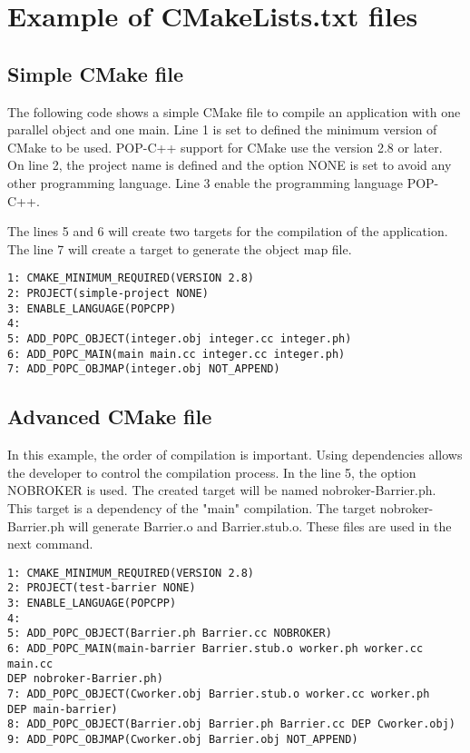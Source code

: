 \documentclass[a4paper, 11pt]{article}
\newcommand{\s}{\vspace{0.3cm}}
\begin{document}
\section{Example of CMakeLists.txt files}
\label{chap:example}
\subsection{Simple CMake file}
The following code shows a simple CMake file to compile an application with one parallel object and one main. Line 1 is set to defined the minimum version of CMake to be used. POP-C++ support for CMake use the version 2.8 or later. \\
On line 2, the project name is defined and the option NONE is set to avoid any other programming language. Line 3 enable the programming language POP-C++.\s

The lines 5 and 6 will create two targets for the compilation of the application. The line 7 will create a target to generate the object map file. \s

\begin{lstlisting}
1: CMAKE_MINIMUM_REQUIRED(VERSION 2.8)
2: PROJECT(simple-project NONE)
3: ENABLE_LANGUAGE(POPCPP)
4: 
5: ADD_POPC_OBJECT(integer.obj integer.cc integer.ph)
6: ADD_POPC_MAIN(main main.cc integer.cc integer.ph)
7: ADD_POPC_OBJMAP(integer.obj NOT_APPEND)
\end{lstlisting}


\subsection{Advanced CMake file}
In this example, the order of compilation is important. Using dependencies allows the developer to control the compilation process. In the line 5, the option NOBROKER is used. The created target will be named nobroker-Barrier.ph. This target is a dependency of the "main" compilation. The target nobroker-Barrier.ph will generate Barrier.o and Barrier.stub.o. These files are used in the next command. \s
\begin{lstlisting}
1: CMAKE_MINIMUM_REQUIRED(VERSION 2.8)
2: PROJECT(test-barrier NONE)
3: ENABLE_LANGUAGE(POPCPP)
4:
5: ADD_POPC_OBJECT(Barrier.ph Barrier.cc NOBROKER)
6: ADD_POPC_MAIN(main-barrier Barrier.stub.o worker.ph worker.cc main.cc 
DEP nobroker-Barrier.ph)
7: ADD_POPC_OBJECT(Cworker.obj Barrier.stub.o worker.cc worker.ph 
DEP main-barrier)
8: ADD_POPC_OBJECT(Barrier.obj Barrier.ph Barrier.cc DEP Cworker.obj)
9: ADD_POPC_OBJMAP(Cworker.obj Barrier.obj NOT_APPEND)
\end{lstlisting}\s
\end{document}
